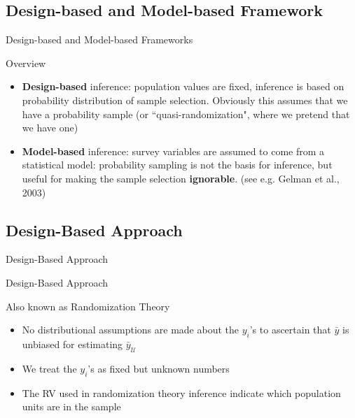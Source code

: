 \documentclass[10pt]{beamer}\usepackage[]{graphicx}\usepackage[]{xcolor}
\begin{document}
\subsection{Design-based and Model-based Framework}
\begin{frame}{}
\begin{block}{}
\begin{center}
Design-based and Model-based Frameworks
\end{center}
\end{block}
\end{frame}


\begin{frame}{Overview}

\begin{itemize}
\item \textbf{Design-based} inference: population values are fixed, inference is based on probability distribution of sample selection. Obviously this assumes that we have a probability sample (or ``quasi-randomization", where we pretend that we have one)
\item \textbf{Model-based} inference: survey variables are assumed to come from a statistical model: probability sampling is not the basis for inference, but useful for making the sample selection \textbf{ignorable}. (see e.g. Gelman et al., 2003)
\end{itemize}

\end{frame}

\subsection{Design-Based Approach}
\begin{frame}{}
\begin{block}{}
\begin{center}
Design-Based Approach
\end{center}
\end{block}
\end{frame}

\begin{frame}{Design-Based Approach}
\begin{block}{Also known as Randomization Theory}
\begin{itemize}
\item No distributional assumptions are made about the $y_i$'s to ascertain that $\bar{y}$ is unbiased for estimating $\bar{y}_{\mathcal{U}}$
\item We treat the $y_i$'s as fixed but unknown numbers
\item The RV used in randomization theory inference indicate which population units are in the sample
\end{itemize}
\end{block}
\end{frame}
\end{document}

